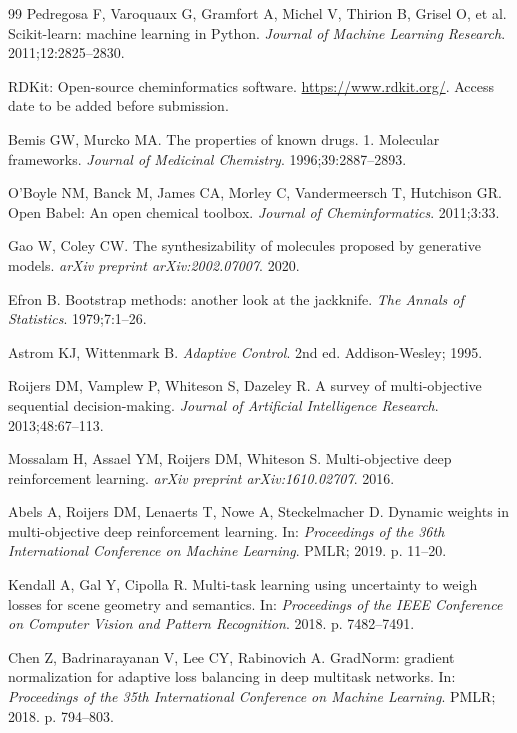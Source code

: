 \documentclass[referee,lineno,pdflatex,sn-basic]{sn-jnl}
\theoremstyle{thmstyleone}%
\theoremstyle{thmstyletwo}%
\theoremstyle{thmstylethree}%
\begin{document}
\begin{thebibliography}{99}
Pedregosa F, Varoquaux G, Gramfort A, Michel V, Thirion B, Grisel O, et al.
Scikit-learn: machine learning in Python.
\textit{Journal of Machine Learning Research}. 2011;12:2825--2830.

RDKit: Open-source cheminformatics software.
\url{https://www.rdkit.org/}. Access date to be added before submission.

Bemis GW, Murcko MA.
The properties of known drugs. 1. Molecular frameworks.
\textit{Journal of Medicinal Chemistry}. 1996;39:2887--2893.

O'Boyle NM, Banck M, James CA, Morley C, Vandermeersch T, Hutchison GR.
Open Babel: An open chemical toolbox.
\textit{Journal of Cheminformatics}. 2011;3:33.

Gao W, Coley CW.
The synthesizability of molecules proposed by generative models.
\textit{arXiv preprint arXiv:2002.07007}. 2020.

Efron B.
Bootstrap methods: another look at the jackknife.
\textit{The Annals of Statistics}. 1979;7:1--26.

Astrom KJ, Wittenmark B.
\textit{Adaptive Control}.
2nd ed. Addison-Wesley; 1995.

Roijers DM, Vamplew P, Whiteson S, Dazeley R.
A survey of multi-objective sequential decision-making.
\textit{Journal of Artificial Intelligence Research}. 2013;48:67--113.

Mossalam H, Assael YM, Roijers DM, Whiteson S.
Multi-objective deep reinforcement learning.
\textit{arXiv preprint arXiv:1610.02707}. 2016.

Abels A, Roijers DM, Lenaerts T, Nowe A, Steckelmacher D.
Dynamic weights in multi-objective deep reinforcement learning.
In: \textit{Proceedings of the 36th International Conference on Machine Learning}. PMLR; 2019. p. 11--20.

Kendall A, Gal Y, Cipolla R.
Multi-task learning using uncertainty to weigh losses for scene geometry and semantics.
In: \textit{Proceedings of the IEEE Conference on Computer Vision and Pattern Recognition}. 2018. p. 7482--7491.

Chen Z, Badrinarayanan V, Lee CY, Rabinovich A.
GradNorm: gradient normalization for adaptive loss balancing in deep multitask networks.
In: \textit{Proceedings of the 35th International Conference on Machine Learning}. PMLR; 2018. p. 794--803.


\end{thebibliography}
\end{document}
